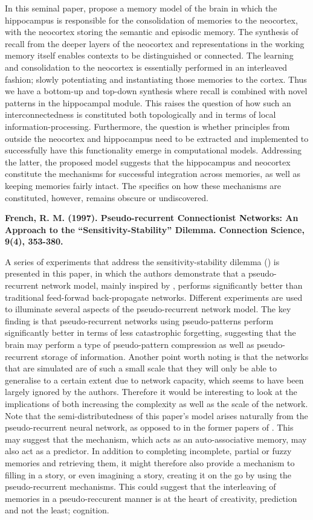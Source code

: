 In this seminal paper, \cite{McClelland1995} propose a memory model of the brain in which the hippocampus is responsible for the consolidation of memories to the neocortex, with the neocortex storing the semantic and episodic memory. The synthesis of recall from the deeper layers of the neocortex and representations in the working memory itself enables contexts to be distinguished or connected. The learning and consolidation to the neocortex is essentially performed in an interleaved fashion; slowly potentiating and instantiating those memories to the cortex. Thus we have a bottom-up and top-down synthesis where recall is combined with novel patterns in the hippocampal module. This raises the question of how such an interconnectedness is constituted both topologically and in terms of local information-processing. Furthermore, the question is whether principles from outside the neocortex and hippocampus need to be extracted and implemented to successfully have this functionality emerge in computational models. Addressing the latter, the proposed model suggests that the hippocampus and neocortex constitute the mechanisms for successful integration across memories, as well as keeping memories fairly intact. The specifics on how these mechanisms are constituted, however, remains obscure or undiscovered.


\textbf{French, R. M. (1997). Pseudo-recurrent Connectionist Networks: An Approach to the “Sensitivity-Stability” Dilemma. Connection Science, 9(4), 353-380.}

A series of experiments that address the sensitivity-stability dilemma (\cite{Hebb1949}) is presented in this paper, in which the authors demonstrate that a pseudo-recurrent network model, mainly inspired by \cite{McClelland1995}, performs significantly better than traditional feed-forwad back-propagate networks. Different experiments are used to illuminate several aspects of the pseudo-recurrent network model. The key finding is that pseudo-recurrent networks using pseudo-patterns perform significantly better in terms of less catastrophic forgetting, suggesting that the brain may perform a type of pseudo-pattern compression as well as pseudo-recurrent storage of information. Another point worth noting is that the networks that are simulated are of such a small scale that they will only be able to generalise to a certain extent due to network capacity, which seems to have been largely ignored by the authors. Therefore it would be interesting to look at the implications of both increasing the complexity as well as the scale of the network. Note that the semi-distributedness of this paper's model arises naturally from the pseudo-recurrent neural network, as opposed to in the former papers of \cite{French1992, French1994}. This may suggest that the mechanism, which acts as an auto-associative memory, may also act as a predictor. In addition to completing incomplete, partial or fuzzy memories and retrieving them, it might therefore also provide a mechanism to filling in a story, or even imagining a story, creating it on the go by using the pseudo-recurrent mechanisms. This could suggest that the interleaving of memories in a pseudo-reccurent manner is at the heart of creativity, prediction and not the least; cognition.


